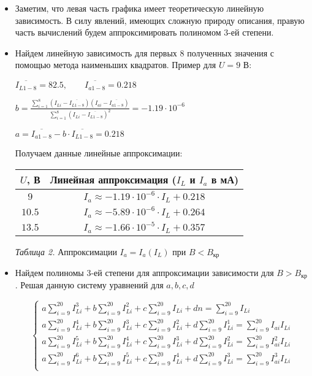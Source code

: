 \begin{itemize}
    \item Заметим, что левая часть графика имеет теоретическую линейную зависимость. В силу 
    явлений, имеющих сложную природу описания, правую часть вычислений будем аппроксимировать 
    полиномом 3-ей степени.

    \item Найдем линейную зависимость для первых 8 полученных значения с помощью метода наименьших квадратов. 
    Пример для $U = 9$ В:

    $\overline{I_{L1-8}} = 82.5, \qquad \overline{I_{a1-8}} = 0.218$

    $\displaystyle b = \frac{\sum_{i = 1}^8 (I_{Li} - \overline{I_{L1-8}})(I_{ai} - \overline{I_{a1-8}})}{\sum_{i = 1}^8 (I_{Li} - \overline{I_{L1-8}})^2} = -1.19 \cdot 10^{-6}$

    $a = \overline{I_{a1-8}} - b \cdot \overline{I_{L1-8}} = 0.218$

    Получаем данные линейные аппроксимации:

    \begin{center}
        \begin{tabular}{|c|c|}
            \hline
            $U$, В & Линейная аппроксимация ($I_L$ и $I_a$ в мА) \\
            \hline
            $9$ & $I_a \approx -1.19 \cdot 10^{-6} \cdot I_L + 0.218$ \\
            \hline
            $10.5$ & $I_a \approx -5.89 \cdot 10^{-6} \cdot I_L + 0.264$ \\
            \hline
            $13.5$ & $I_a \approx -1.66 \cdot 10^{-5} \cdot I_L + 0.357$ \\
            \hline
        \end{tabular}

        \smallvspace

        \textit{Таблица 2.} Аппроксимации $I_a = I_a(I_L)$ при $B < B_\text{кр}$

    \end{center}

    \item Найдем полиномы 3-ей степени для аппроксимации зависимости для $B > B_\text{кр}$. 
    Решая данную систему уравнений для $a, b, c, d$

    \[\begin{cases} \displaystyle 
        a \sum_{i = 9}^{20} I_{Li}^3 + b \sum_{i = 9}^{20} I_{Li}^2 + c \sum_{i = 9}^{20} I_{Li} + d n = \sum_{i = 9}^{20} I_{Li}   \\
        a \sum_{i = 9}^{20} I_{Li}^4 + b \sum_{i = 9}^{20} I_{Li}^3 + c \sum_{i = 9}^{20} I_{Li}^2 + d \sum_{i = 9}^{20} I_{Li}^1 = \sum_{i = 9}^{20} I_{ai} I_{Li}   \\
        a \sum_{i = 9}^{20} I_{Li}^5 + b \sum_{i = 9}^{20} I_{Li}^4 + c \sum_{i = 9}^{20} I_{Li}^3 + d \sum_{i = 9}^{20} I_{Li}^2 = \sum_{i = 9}^{20} I_{ai}^2 I_{Li}   \\
        a \sum_{i = 9}^{20} I_{Li}^6 + b \sum_{i = 9}^{20} I_{Li}^5 + c \sum_{i = 9}^{20} I_{Li}^4 + d \sum_{i = 9}^{20} I_{Li}^3 = \sum_{i = 9}^{20} I_{ai}^3 I_{Li}  \\
    \end{cases}\]


\end{itemize}
